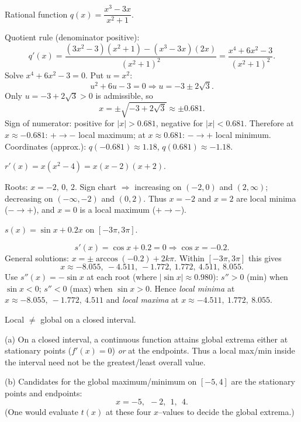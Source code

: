 \documentclass[11pt]{article}
\def\textbf#1{#1}%
\begin{document}
\begin{solution}
\textbf{Rational function $q(x)=\dfrac{x^{3}-3x}{x^{2}+1}$.}

Quotient rule (denominator positive):
\[
q'(x)=\frac{(3x^{2}-3)(x^{2}+1)-(x^{3}-3x)(2x)}{(x^{2}+1)^{2}}
=\frac{x^{4}+6x^{2}-3}{(x^{2}+1)^{2}}.
\]
Solve $x^{4}+6x^{2}-3=0$. Put $u=x^{2}$:
\[
u^{2}+6u-3=0 \Rightarrow u=-3\pm2\sqrt3.
\]
Only $u=-3+2\sqrt3>0$ is admissible, so
\[
x=\boxed{\pm\sqrt{-3+2\sqrt3}}\approx \boxed{\pm0.681}.
\]
Sign of numerator: positive for $|x|>0.681$, negative for $|x|<0.681$.  
Therefore at $x\approx -0.681$: $+\to-$ \textbf{local maximum};  
at $x\approx 0.681$: $-\to+$ \textbf{local minimum}.  
Coordinates (approx.): $q(-0.681)\approx \boxed{1.18}$, $q(0.681)\approx \boxed{-1.18}$.
\end{solution}

\begin{solution}
\textbf{$r'(x)=x(x^{2}-4)=x(x-2)(x+2)$.}

Roots: $\boxed{x=-2,\,0,\,2}$.  
Sign chart $\Rightarrow$ increasing on $(-2,0)$ and $(2,\infty)$; decreasing on $(-\infty,-2)$ and $(0,2)$.  
Thus $x=-2$ and $x=2$ are \textbf{local minima} ($-\to+$), and $x=0$ is a \textbf{local maximum} ($+\to-$).
\end{solution}

\begin{solution}
\textbf{ $s(x)=\sin x+0.2x$ on $[-3\pi,3\pi]$.}

\[
s'(x)=\cos x+0.2=0 \Rightarrow \cos x=-0.2.
\]
General solutions: $x=\pm\arccos(-0.2)+2k\pi$.  
Within $[-3\pi,3\pi]$ this gives
\[
\boxed{x\approx -8.055,\ -4.511,\ -1.772,\ 1.772,\ 4.511,\ 8.055}.
\]
Use $s''(x)=-\sin x$ at each root (where $|\sin x|\approx 0.980$):  
$s''>0$ (min) when $\sin x<0$; $s''<0$ (max) when $\sin x>0$.  
Hence \emph{local minima} at $\boxed{x\approx -8.055,\ -1.772,\ 4.511}$ and \emph{local maxima} at $\boxed{x\approx -4.511,\ 1.772,\ 8.055}$.
\end{solution}

\begin{solution}
\textbf{Local $\neq$ global on a closed interval.}

(a) On a closed interval, a continuous function attains global extrema either at stationary points ($f'(x)=0$) \emph{or} at the endpoints. Thus a local max/min inside the interval need not be the greatest/least overall value.

(b) Candidates for the global maximum/minimum on $[-5,4]$ are the stationary points and endpoints:
\[
\boxed{x=-5,\ \ -2,\ \ 1,\ \ 4}.
\]
(One would evaluate $t(x)$ at these four $x$–values to decide the global extrema.)
\end{solution}
\end{document}
